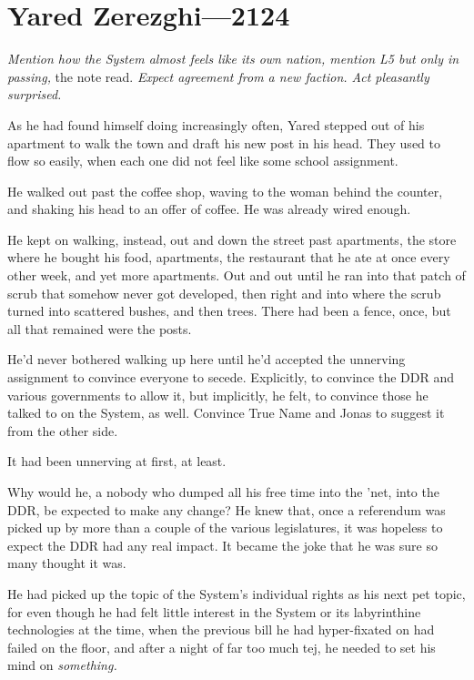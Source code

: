 \hypertarget{yared-zerezghi-2124}{%
\chapter{Yared Zerezghi—2124}\label{yared-zerezghi-2124}}

\emph{Mention how the System almost feels like its own nation, mention L5 but only in passing,} the note read. \emph{Expect agreement from a new faction. Act pleasantly surprised.}

As he had found himself doing increasingly often, Yared stepped out of his apartment to walk the town and draft his new post in his head. They used to flow so easily, when each one did not feel like some school assignment.

He walked out past the coffee shop, waving to the woman behind the counter, and shaking his head to an offer of coffee. He was already wired enough.

He kept on walking, instead, out and down the street past apartments, the store where he bought his food, apartments, the restaurant that he ate at once every other week, and yet more apartments. Out and out until he ran into that patch of scrub that somehow never got developed, then right and into where the scrub turned into scattered bushes, and then trees. There had been a fence, once, but all that remained were the posts.

He'd never bothered walking up here until he'd accepted the unnerving assignment to convince everyone to secede. Explicitly, to convince the DDR and various governments to allow it, but implicitly, he felt, to convince those he talked to on the System, as well. Convince True Name and Jonas to suggest it from the other side.

It had been unnerving at first, at least.

Why would he, a nobody who dumped all his free time into the 'net, into the DDR, be expected to make any change? He knew that, once a referendum was picked up by more than a couple of the various legislatures, it was hopeless to expect the DDR had any real impact. It became the joke that he was sure so many thought it was.

He had picked up the topic of the System's individual rights as his next pet topic, for even though he had felt little interest in the System or its labyrinthine technologies at the time, when the previous bill he had hyper-fixated on had failed on the floor, and after a night of far too much tej, he needed to set his mind on \emph{something.}

